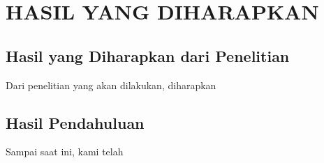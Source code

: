\chapter{HASIL YANG DIHARAPKAN}

\section{Hasil yang Diharapkan dari Penelitian}

Dari penelitian yang akan dilakukan, diharapkan \lipsum[15]

\section{Hasil Pendahuluan}

Sampai saat ini, kami telah \lipsum[16]
